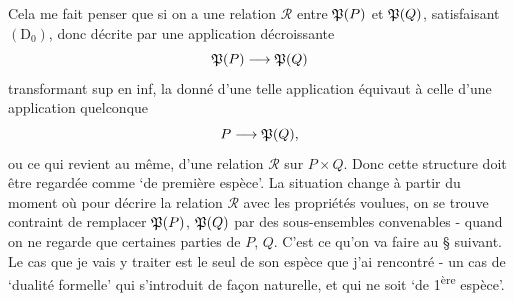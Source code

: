 Cela me fait penser que si on a une relation $\mathcal{R}$ entre $\mathfrak{P}(P)$ et $\mathfrak{P}(Q)$, satisfaisant $(\mathrm{D}_0)$, donc décrite par une application décroissante
\[
\mathfrak{P}(P)\longrightarrow\mathfrak{P}(Q)
\]
transformant sup en inf, la donné d'une telle application équivaut à celle d'une application quelconque %
\[
P\longrightarrow\mathfrak{P}(Q),
\]
ou ce qui revient au même, d'une relation $\mathcal{R}$ sur $P\times Q$. Donc cette structure doit être regardée comme ‘de première espèce’. La situation change à partir du moment où pour décrire la relation $\mathcal{R}$ avec les propriétés voulues, on se trouve contraint de remplacer $\mathfrak{P}(P)$, $\mathfrak{P}(Q)$ par des sous-ensembles convenables - quand on ne regarde que certaines parties de $P$, $Q$. C'est ce qu'on
va faire au § suivant. Le cas que je vais y traiter est le seul de son espèce que j'ai rencontré - un cas de ‘dualité formelle’ qui s'introduit de façon naturelle, et qui ne soit ‘de 1\textsuperscript{ère} espèce’.

